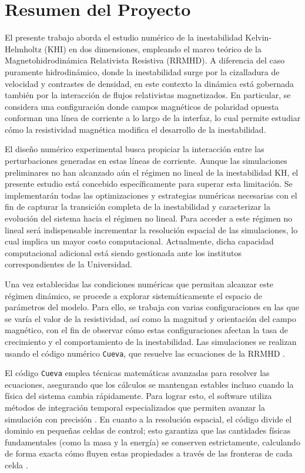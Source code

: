 \section{Resumen del Proyecto}
El presente trabajo aborda el estudio numérico de la inestabilidad Kelvin-Helmholtz (KHI) en dos dimensiones, empleando el marco teórico de la Magnetohidrodinámica Relativista Resistiva (RRMHD). A diferencia del caso puramente hidrodinámico, donde la inestabilidad surge por la cizalladura de velocidad y contrastes de densidad, en este contexto la dinámica está gobernada también por la interacción de flujos relativistas magnetizados. En particular, se considera una configuración donde campos magnéticos de polaridad opuesta conforman una línea de corriente a lo largo de la interfaz, lo cual permite estudiar cómo la resistividad magnética modifica el desarrollo de la inestabilidad.

El diseño numérico experimental busca propiciar la interacción entre las perturbaciones generadas en estas líneas de corriente. Aunque las simulaciones preliminares no han alcanzado aún el régimen no lineal de la inestabilidad KH, el presente estudio está concebido específicamente para superar esta limitación. Se implementarán todas las optimizaciones y estrategias numéricas necesarias con el fin de capturar la transición completa de la inestabilidad y caracterizar la evolución del sistema hacia el régimen no lineal. Para acceder a este régimen no lineal será indispensable incrementar la resolución espacial de las simulaciones, lo cual implica un mayor costo computacional. Actualmente, dicha capacidad computacional adicional está siendo gestionada ante los institutos correspondientes de la Universidad.

Una vez establecidas las condiciones numéricas que permitan alcanzar este régimen dinámico, se procede a explorar sistemáticamente el espacio de parámetros del modelo. Para ello, se trabaja con varias configuraciones en las que se varía el valor de la resistividad, así como la magnitud y orientación del campo magnético, con el fin de observar cómo estas configuraciones afectan la tasa de crecimiento y el comportamiento de la inestabilidad. Las simulaciones se realizan usando el código numérico \texttt{Cueva}, que resuelve las ecuaciones de la RRMHD \citep{aranguren-2013}.

El código \texttt{Cueva} emplea técnicas matemáticas avanzadas para resolver las ecuaciones, 
asegurando que los cálculos se mantengan estables incluso cuando la física del sistema cambia  rápidamente. Para lograr esto, el software utiliza métodos de integración temporal especializados que permiten avanzar la simulación con precisión 
\citep{palenzuela-2009, Aloy_Cordero-Carrion:2016}. En cuanto a la resolución espacial, 
el código divide el dominio en pequeñas celdas de control; esto garantiza que las cantidades 
físicas fundamentales (como la masa y la energía) se conserven estrictamente, calculando 
de forma exacta cómo fluyen estas propiedades a través de las fronteras de cada celda 
\citep{miranda-aranguren-2018}.

